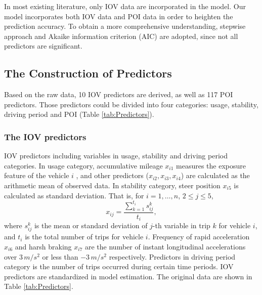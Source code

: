 \documentclass[sii]{ipart}
\theoremstyle{plain}
\begin{document}
In most existing literature, only IOV data are incorporated in the model. Our model incorporates both IOV data and POI data in order to heighten the prediction accuracy. To obtain a more comprehensive understanding, stepwise approach and Akaike information criterion (AIC) \cite{akaike1987factor} are adopted, since not all predictors are significant.



\subsection{The Construction of Predictors} 
Based on the raw data, 10 IOV predictors are derived, as well as 117 POI predictors. Those predictors could be divided into four categories: usage, stability, driving period and POI (Table \ref{tab:Predictors}). 

\subsubsection{The IOV predictors}
IOV predictors including variables in usage, stability and driving period categories. In usage category, accumulative mileage $x_{i1}$ measures the exposure feature of the vehicle $i$ \cite{wolfe1982concept}, and other predictors ($x_{i2},x_{i3},x_{i4}$) are calculated as the arithmetic mean of observed data. In stability category, steer position $x_{i5}$ is calculated as standard deviation. That is, for $i=1, \dots ,n$, $2 \leq j \leq 5$,
$$x_{ij}=\frac{\sum_{k=1}^{t_i} s_{ij}^k}{t_i},$$
where $s_{ij}^k$ is the mean or standard deviation of $j$-th variable in trip $k$ for vehicle $i$, and $t_i$ is the total number of trips for vehicle $i$. 
Frequency of rapid acceleration $x_{i6}$ and harsh braking $x_{i7}$ are the number of instant longitudinal accelerations over $3 \, m/s^2$ or less than $-3 \,  m/s^2$ respectively. Predictors in driving period category is the number of trips occurred during certain time periods. IOV predictors are standardized in model estimation. The original data are shown in Table \ref{tab:Predictors}.		
\end{document}
